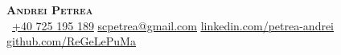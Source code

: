 \begin{center}
    \textbf{\Huge \scshape Andrei Petrea} \\ \vspace{10pt}
     \ \small \href{tel:+40725195189}{+40 725 195 189} \quad
    \href{mailto:scpetrea@gmail.com}{ \underline{scpetrea@gmail.com}} \quad
    \href{https://www.linkedin.com/in/petrea-andrei/}{ \underline{linkedin.com/petrea-andrei}} \quad
    \href{https://github.com/ReGeLePuMa}{ \underline{github.com/ReGeLePuMa}}
\end{center}
